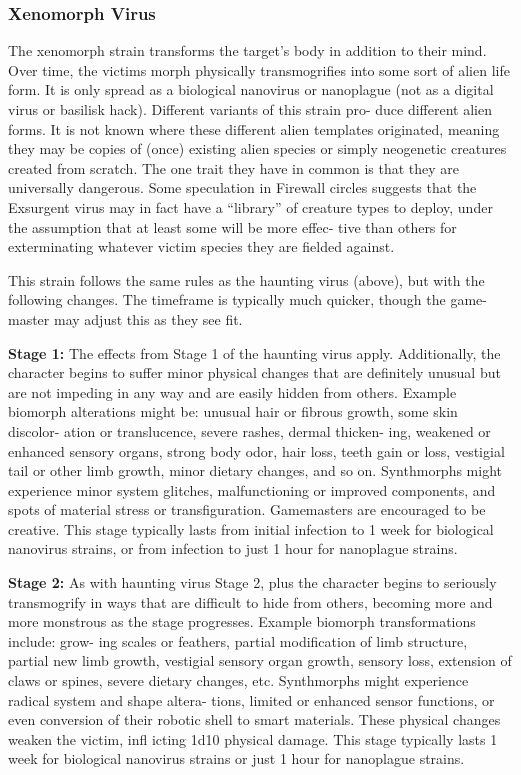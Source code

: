 \subsubsection{Xenomorph Virus}

The xenomorph strain transforms the target's body 
in addition to their mind. Over time, the victims 
morph physically transmogrifies into some sort 
of alien life form. It is only spread as a biological 
nanovirus or nanoplague (not as a digital virus or 
basilisk hack). Different variants of this strain pro-
duce different alien forms. It is not known where 
these different alien templates originated, meaning 
they may be copies of (once) existing alien species 
or simply neogenetic creatures created from scratch. 
The one trait they have in common is that they are 
universally dangerous. Some speculation in Firewall 
circles suggests that the Exsurgent virus may in fact 
have a ``library'' of creature types to deploy, under 
the assumption that at least some will be more effec-
tive than others for exterminating whatever victim 
species they are fielded against. 

This strain follows the same rules as the haunting 
virus (above), but with the following changes. The 
timeframe is typically much quicker, though the game-
master may adjust this as they see fit.

\textbf{Stage 1:} The effects from Stage 1 of the haunting 
virus apply. Additionally, the character begins to suffer 
minor physical changes that are definitely unusual but 
are not impeding in any way and are easily hidden 
from others. Example biomorph alterations might be: 
unusual hair or fibrous growth, some skin discolor-
ation or translucence, severe rashes, dermal thicken-
ing, weakened or enhanced sensory organs, strong 
body odor, hair loss, teeth gain or loss, vestigial tail or 
other limb growth, minor dietary changes, and so on. 
Synthmorphs might experience minor system glitches, 
malfunctioning or improved components, and spots 
of material stress or transfiguration.  Gamemasters 
are encouraged to be creative. This stage typically 
lasts from initial infection to 1 week for biological 
nanovirus strains, or from infection to just 1 hour for 
nanoplague strains.

\textbf{Stage 2:} As with haunting virus Stage 2, plus the 
character begins to seriously transmogrify in ways 
that are difficult to hide from others, becoming 
more and more monstrous as the stage progresses. 
Example biomorph transformations include: grow-
ing scales or feathers, partial modification of limb 
structure, partial new limb growth, vestigial sensory 
organ growth, sensory loss, extension of claws or 
spines, severe dietary changes, etc. Synthmorphs 
might experience radical system and shape altera-
tions, limited or enhanced sensor functions, or even 
conversion of their robotic shell to smart materials. 
These physical changes weaken the victim, infl icting 
1d10 physical damage. This stage typically lasts 1 
week for biological nanovirus strains or just 1 hour 
for nanoplague strains.

